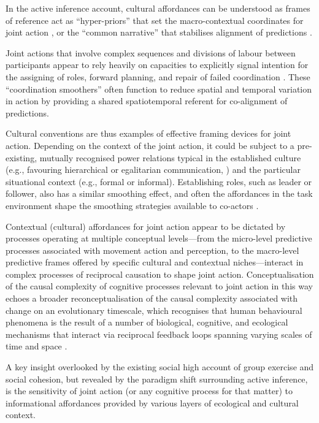 \begin{CJK}{UTF8}{gbsn}
In the active inference account, cultural affordances can be understood as frames of reference act as ``hyper-priors'' that set the macro-contextual coordinates for joint action \citep{Clark2013}, or the ``common narrative'' that stabilises alignment of predictions \citep{Friston2015}.

Joint actions that involve complex sequences and divisions of labour between participants appear to rely heavily on capacities to explicitly signal intention for the assigning of roles, forward planning, and repair of failed coordination \citep{Frith2010}.  These ``coordination smoothers'' \citep{Vesper2017} often function to reduce spatial and temporal variation in action by providing a shared spatiotemporal referent for co-alignment of predictions.

Cultural conventions are thus examples of effective framing devices for joint action.  Depending on the context of the joint action, it could be subject to a pre-existing, mutually recognised power relations typical in the established culture (e.g., favouring hierarchical or egalitarian communication, \citep[see]{Cheon2011}) and the particular situational context (e.g., formal or informal).  Establishing roles, such as leader or follower, also has a similar smoothing effect, and often the affordances in the task environment shape the smoothing strategies available to co-actors \citep{Marsh2009}.

Contextual (cultural) affordances for joint action appear to be dictated by processes operating at multiple conceptual levels---from the micro-level predictive processes associated with movement action and perception, to the macro-level predictive frames offered by specific cultural and contextual niches---interact in complex processes of reciprocal causation to shape joint action.  Conceptualisation of the causal complexity of cognitive processes relevant to joint action in this way echoes a broader reconceptualisation of the causal complexity associated with change on an evolutionary timescale, which recognises that human behavioural phenomena is the result of a number of biological, cognitive, and ecological mechanisms that interact via reciprocal feedback loops spanning varying scales of time and space \citep{Fuentes2015}.

A key insight overlooked by the existing social high account of group exercise and social cohesion, but revealed by the paradigm shift surrounding active inference, is the sensitivity of joint action (or any cognitive process for that matter) to informational affordances provided by various layers of ecological and cultural context.



\end{CJK}
